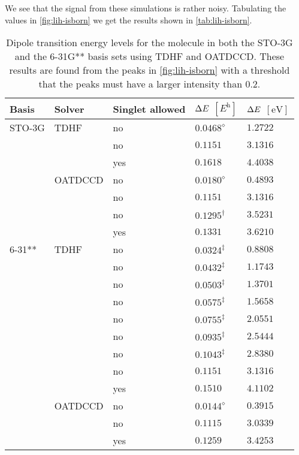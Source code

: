         We see that the signal from these simulations is rather noisy.
        Tabulating the values in \autoref{fig:lih-isborn} we get the results
        shown in \autoref{tab:lih-isborn}.
        \begin{table}
            \centering
            \caption{Dipole transition energy levels for the  molecule in
            both the STO-3G and the 6-31G** basis sets using TDHF and OATDCCD.
            These results are found from the peaks in \autoref{fig:lih-isborn}
            with a threshold that the peaks must have a larger intensity than
            $\num{0.2}$.}
            \renewcommand{\arraystretch}{1.3}
            \begin{tabular}{@{}lllll@{}}
                \toprule
                Basis & Solver & Singlet allowed
                & $\Delta E$ $[\si{\hartree}]$
                & $\Delta E$ $[\si{\electronvolt}]$
                \\
                \midrule
                STO-3G & TDHF & no & $0.0468^{\diamond}$ & $1.2722$ \\
                & & no & $0.1151$ & $3.1316$ \\
                & & yes & $0.1618$ & $4.4038$ \\
                & OATDCCD & no & $0.0180^{\diamond}$ & $0.4893$ \\
                & & no & $0.1151$ & $3.1316$ \\
                & & no & $0.1295^{\dagger}$ & $3.5231$ \\
                & & yes & $0.1331$ & $3.6210$ \\
                6-31** & TDHF & no & $0.0324^{\ddagger}$ & $0.8808$ \\
                & & no & $0.0432^{\ddagger}$ & $1.1743$ \\
                & & no & $0.0503^{\ddagger}$ & $1.3701$ \\
                & & no & $0.0575^{\ddagger}$ & $1.5658$ \\
                & & no & $0.0755^{\ddagger}$ & $2.0551$ \\
                & & no & $0.0935^{\ddagger}$ & $2.5444$ \\
                & & no & $0.1043^{\ddagger}$ & $2.8380$ \\
                & & no & $0.1151$ & $3.1316$ \\
                & & yes & $0.1510$ & $4.1102$ \\
                & OATDCCD & no & $0.0144^{\diamond}$ & $0.3915$ \\
                & & no & $0.1115$ & $3.0339$ \\
                & & yes & $0.1259$ & $3.4253$ \\
                \bottomrule
            \end{tabular}
            \label{tab:lih-isborn}
        \end{table}
